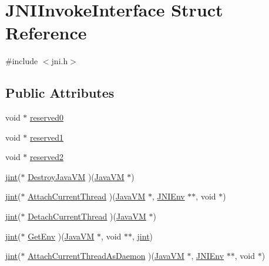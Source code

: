 \hypertarget{struct_j_n_i_invoke_interface}{\section{J\-N\-I\-Invoke\-Interface Struct Reference}
\label{struct_j_n_i_invoke_interface}
}


{\ttfamily \#include $<$jni.\-h$>$}

\subsection*{Public Attributes}
\begin{DoxyCompactItemize}
\item 
void $\ast$ \hyperlink{struct_j_n_i_invoke_interface_a1e45369a2faf34db2441e17c2b59b4c5}{reserved0}
\item 
void $\ast$ \hyperlink{struct_j_n_i_invoke_interface_a34cafbab0675adc150e12eaf4710eb37}{reserved1}
\item 
void $\ast$ \hyperlink{struct_j_n_i_invoke_interface_a42cba639995c9d29a45b7581c7350010}{reserved2}
\item 
\hyperlink{jni_8h_ad6e59d976b9b5bae7a19d746bd2879c1}{jint}($\ast$ \hyperlink{struct_j_n_i_invoke_interface_aff59d0dcac4f04992b9b3a05c7624120}{Destroy\-Java\-V\-M} )(\hyperlink{jni_8h_af9349ee5bb0a99fab460a1b46fc077d5}{Java\-V\-M} $\ast$)
\item 
\hyperlink{jni_8h_ad6e59d976b9b5bae7a19d746bd2879c1}{jint}($\ast$ \hyperlink{struct_j_n_i_invoke_interface_abcdc26f5facdb9f6e1550616a8ca1d56}{Attach\-Current\-Thread} )(\hyperlink{jni_8h_af9349ee5bb0a99fab460a1b46fc077d5}{Java\-V\-M} $\ast$, \hyperlink{jni_8h_a2d06d32b6b6f1519799078a36fe2e380}{J\-N\-I\-Env} $\ast$$\ast$, void $\ast$)
\item 
\hyperlink{jni_8h_ad6e59d976b9b5bae7a19d746bd2879c1}{jint}($\ast$ \hyperlink{struct_j_n_i_invoke_interface_a722aaa4bbb55bfa50fc4b9e3f3ca4a68}{Detach\-Current\-Thread} )(\hyperlink{jni_8h_af9349ee5bb0a99fab460a1b46fc077d5}{Java\-V\-M} $\ast$)
\item 
\hyperlink{jni_8h_ad6e59d976b9b5bae7a19d746bd2879c1}{jint}($\ast$ \hyperlink{struct_j_n_i_invoke_interface_a9aac5046fc512129703bb6215c9d60b6}{Get\-Env} )(\hyperlink{jni_8h_af9349ee5bb0a99fab460a1b46fc077d5}{Java\-V\-M} $\ast$, void $\ast$$\ast$, \hyperlink{jni_8h_ad6e59d976b9b5bae7a19d746bd2879c1}{jint})
\item 
\hyperlink{jni_8h_ad6e59d976b9b5bae7a19d746bd2879c1}{jint}($\ast$ \hyperlink{struct_j_n_i_invoke_interface_a00bb873d81be3814dda5a566a7213ce3}{Attach\-Current\-Thread\-As\-Daemon} )(\hyperlink{jni_8h_af9349ee5bb0a99fab460a1b46fc077d5}{Java\-V\-M} $\ast$, \hyperlink{jni_8h_a2d06d32b6b6f1519799078a36fe2e380}{J\-N\-I\-Env} $\ast$$\ast$, void $\ast$)
\end{DoxyCompactItemize}


